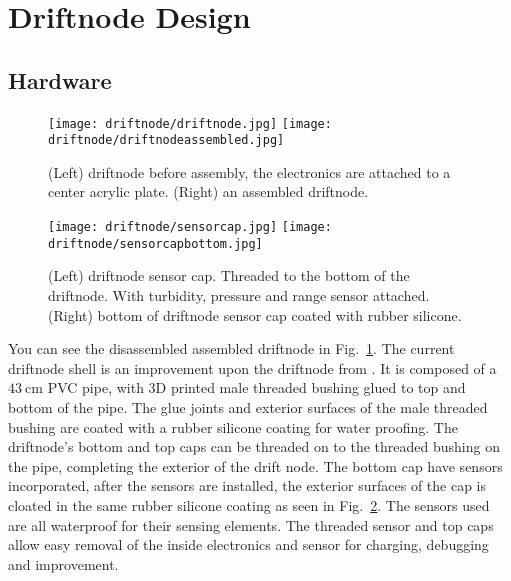 \section[Design]{Driftnode Design}

\subsection[Hardware]{Hardware}

\begin{figure}[h]
	\begin{center}
	\texttt{[image: driftnode/driftnode.jpg]}
	\texttt{[image: driftnode/driftnodeassembled.jpg]}
	\caption[Driftnode]{
		(Left) driftnode before assembly, the electronics are attached to a center acrylic plate.
		(Right) an assembled driftnode.
	} \label{fig:driftnodeoverview}
	\end{center}
	\vspace{-1em}
\end{figure}

\begin{figure}[h]
	\begin{center}
	\texttt{[image: driftnode/sensorcap.jpg]}
	\texttt{[image: driftnode/sensorcapbottom.jpg]}
	\caption[Driftnode]{
		(Left) driftnode sensor cap. Threaded to the bottom of the driftnode. With turbidity, pressure and range sensor attached.
		(Right) bottom of driftnode sensor cap coated with rubber silicone.
	} \label{fig:sensorcap}
	\end{center}
	\vspace{-1em}
\end{figure}

You can see the disassembled assembled driftnode in Fig.~\ref{fig:driftnodeoverview}.
The current driftnode shell is an improvement upon the driftnode from \cite{drifterUSC}.
It is composed of a $\SI{43}{\centi\metre}$ PVC pipe, with 3D printed male threaded bushing glued to top and bottom of the pipe.
The glue joints and exterior surfaces of the male threaded bushing are coated with a rubber silicone coating for water proofing.
The driftnode's bottom and top caps can be threaded on to the threaded bushing on the pipe, completing the exterior of the drift node.
The bottom cap have sensors incorporated, after the sensors are installed, the exterior surfaces of the cap is cloated in the same rubber silicone coating as seen in Fig.~\ref{fig:sensorcap}.
The sensors used are all waterproof for their sensing elements.
The threaded sensor and top caps allow easy removal of the inside electronics and sensor for charging, debugging and improvement.

